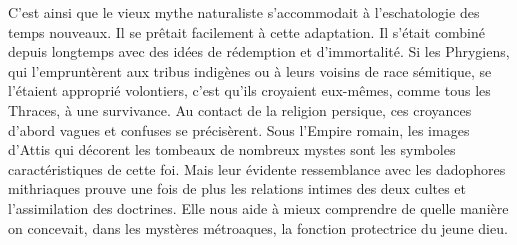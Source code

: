 \documentclass[a4paper, 11pt, oneside, polutonikogreek, french]{article}
\begin{document}
C'est ainsi que le vieux mythe naturaliste s'accommodait à l'eschatologie des temps nouveaux. Il se prêtait facilement à cette adaptation. Il s'était combiné depuis longtemps avec des idées de rédemption et d'immortalité. Si les Phrygiens, qui l'empruntèrent aux tribus indigènes ou à leurs voisins de race sémitique, se l'étaient approprié volontiers, c'est qu'ils croyaient eux-mêmes, comme tous les Thraces, à une survivance. Au contact de la religion persique, ces croyances d'abord vagues et confuses se précisèrent. Sous l'Empire romain, les images d'Attis qui décorent les tombeaux de nombreux mystes sont les symboles caractéristiques de cette foi. Mais leur évidente ressemblance avec les dadophores mithriaques prouve une fois de plus les relations intimes des deux cultes et l'assimilation des doctrines. Elle nous aide à mieux comprendre de quelle manière on concevait, dans les mystères métroaques, la fonction protectrice du jeune dieu.
\end{document}
